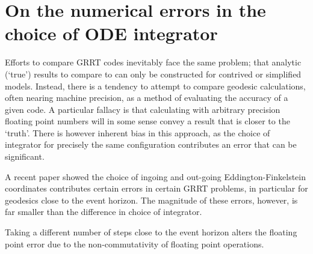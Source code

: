 \section{On the numerical errors in the choice of ODE integrator}
\label{appendix:solvers}

Efforts to compare GRRT codes inevitably face the same problem; that analytic (`true') results to compare to can only be constructed for contrived or simplified models. Instead, there is a tendency to attempt to compare geodesic calculations, often nearing machine precision, as a method of evaluating the accuracy of a given code. A particular fallacy is that calculating with arbitrary precision floating point numbers will in some sense convey a result that is closer to the `truth'. There is however inherent bias in this approach, as the choice of integrator for precisely the same configuration contributes an error that can be significant.

A recent paper  showed the choice of ingoing and out-going Eddington-Finkelstein coordinates contributes certain errors in certain GRRT problems, in particular for geodesics close to the event horizon. The magnitude of these errors, however, is far smaller than the difference in choice of integrator.

Taking a different number of steps close to the event horizon alters the floating point error due to the non-commutativity of floating point operations.



